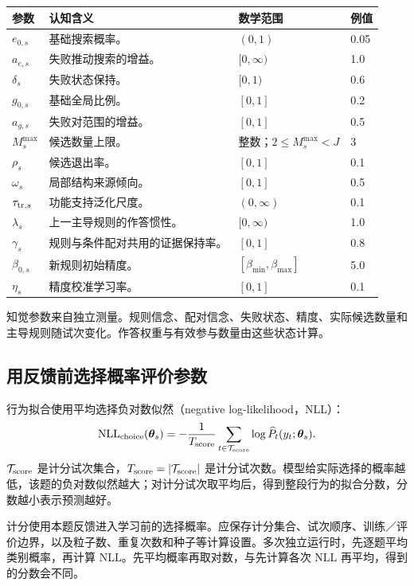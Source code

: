 \documentclass[12pt]{article}
\renewcommand{\arraystretch}{1.2}
\begin{document}
{\small
\renewcommand{\arraystretch}{1.05}
\begin{longtable}{L{1.8cm}L{6.8cm}L{3.4cm}L{1.5cm}}
\toprule
参数 & 认知含义 & 数学范围 & 例值\\
\midrule
\endhead
$e_{0,s}$ & 基础搜索概率。 & $(0,1)$ & 0.05\\
$a_{e,s}$ & 失败推动搜索的增益。 & $[0,\infty)$ & 1.0\\
$\delta_s$ & 失败状态保持。 & $[0,1)$ & 0.6\\
$g_{0,s}$ & 基础全局比例。 & $[0,1]$ & 0.2\\
$a_{g,s}$ & 失败对范围的增益。 & $[0,1]$ & 0.5\\
$M_s^{\max}$ & 候选数量上限。 & 整数；\newline $2\leq M_s^{\max}<J$ & 3\\
$\rho_s$ & 候选退出率。 & $[0,1]$ & 0.1\\
$\omega_s$ & 局部结构来源倾向。 & $[0,1]$ & 0.5\\
$\tau_{{\rm tr},s}$ & 功能支持泛化尺度。 & $(0,\infty)$ & 0.1\\
$\lambda_s$ & 上一主导规则的作答惯性。 & $[0,\infty)$ & 1.0\\
$\gamma_s$ & 规则与条件配对共用的证据保持率。 & $[0,1]$ & 0.8\\
$\beta_{0,s}$ & 新规则初始精度。 & $[\beta_{\min},\beta_{\max}]$ & 5.0\\
$\eta_s$ & 精度校准学习率。 & $[0,1]$ & 0.1\\
\bottomrule
\end{longtable}
}
知觉参数来自独立测量。规则信念、配对信念、失败状态、精度、实际候选数量和主导规则随试次变化。作答权重与有效参与数量由这些状态计算。

\subsection{用反馈前选择概率评价参数}

行为拟合使用平均选择负对数似然（negative log-likelihood，NLL）：
\begin{equation}
\mathrm{NLL}_{\rm choice}(\bm\theta_s)=
-\frac1{T_{\rm score}}\sum_{t\in\mathcal T_{\rm score}}
\log\widehat P_t(y_t;\bm\theta_s).
\label{eq:nll}
\end{equation}
$\mathcal T_{\rm score}$ 是计分试次集合，$T_{\rm score}=|\mathcal T_{\rm score}|$ 是计分试次数。模型给实际选择的概率越低，该题的负对数似然越大；对计分试次取平均后，得到整段行为的拟合分数，分数越小表示预测越好。

计分使用本题反馈进入学习前的选择概率。应保存计分集合、试次顺序、训练／评价边界，以及粒子数、重复次数和种子等计算设置。多次独立运行时，先逐题平均类别概率，再计算 NLL。先平均概率再取对数，与先计算各次 NLL 再平均，得到的分数会不同。
\end{document}
